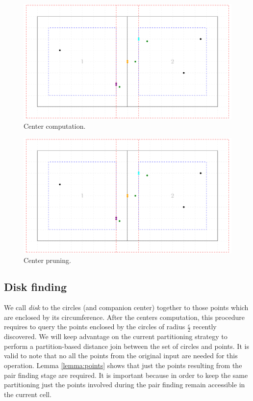 \documentclass[twocolumn]{IEEEtran}
\begin{document}
\begin{figure}[htbp]
  \centering
  \includegraphics[page=3, width=1\columnwidth]{figures/lema1}
  \caption{Center computation.}
  \label{fig:centers}
\end{figure}

\begin{figure}[htbp]
  \centering
    \includegraphics[page=4, width=1\columnwidth]{figures/lema1}
  \caption{Center pruning.}
  \label{fig:centerspruning}
\end{figure}

\subsection*{Disk finding}
We call \textit{disk} to the circles (and companion center) together to those points which are enclosed by its circumference.  After the centers computation, this procedure requires to query the points enclosed by the circles of radius $\frac{\varepsilon}{2}$ recently discovered.  We will keep advantage on the current partitioning strategy to perform a partition-based distance join between the set of circles and points.  It is valid to note that no all the points from the original input are needed for this operation.  Lemma \ref{lemma:points} shows that just the points resulting from the pair finding stage are required.  It is important because in order to keep the same partitioning just the points involved during the pair finding remain accessible in the current cell.
\end{document}
